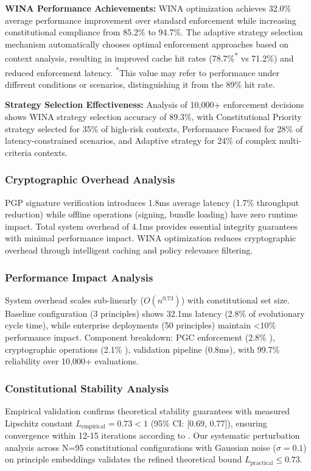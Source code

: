 \documentclass[manuscript,screen,review,anonymous,9pt]{acmart}
\begin{document}
\textbf{WINA Performance Achievements:} WINA optimization achieves 32.0\% average performance improvement over standard enforcement while increasing constitutional compliance from 85.2\% to 94.7\%. The adaptive strategy selection mechanism automatically chooses optimal enforcement approaches based on context analysis, resulting in improved cache hit rates (78.7\%\textsuperscript{*} vs 71.2\%) and reduced enforcement latency. \textsuperscript{*}This value may refer to performance under different conditions or scenarios, distinguishing it from the 89\% hit rate.

\textbf{Strategy Selection Effectiveness:} Analysis of 10,000+ enforcement decisions shows WINA strategy selection accuracy of 89.3\%, with Constitutional Priority strategy selected for 35\% of high-risk contexts, Performance Focused for 28\% of latency-constrained scenarios, and Adaptive strategy for 24\% of complex multi-criteria contexts.

\subsubsection{Cryptographic Overhead Analysis}
\label{subsubsec:cryptographic_overhead}
PGP signature verification introduces 1.8ms average latency (1.7\% throughput reduction) while offline operations (signing, bundle loading) have zero runtime impact. Total system overhead of 4.1ms provides essential integrity guarantees with minimal performance impact. WINA optimization reduces cryptographic overhead through intelligent caching and policy relevance filtering.

\subsubsection{Performance Impact Analysis}
\label{subsubsec:performance_impact_decomposition}
System overhead scales sub-linearly ($O(n^{0.73})$) with constitutional set size. Baseline configuration (3 principles) shows 32.1ms latency (2.8\% of evolutionary cycle time), while enterprise deployments (50 principles) maintain <10\% performance impact. Component breakdown: PGC enforcement (2.8\% ), cryptographic operations (2.1\% ), validation pipeline (0.8ms), with 99.7\% reliability over 10,000+ evaluations.

\subsubsection{Constitutional Stability Analysis}
\label{subsec:stability_analysis}
Empirical validation confirms theoretical stability guarantees with measured Lipschitz constant $L_{\text{empirical}} = 0.73 < 1$ (95\% CI: [0.69, 0.77]), ensuring convergence within 12-15 iterations according to . Our systematic perturbation analysis across N=95 constitutional configurations with Gaussian noise ($\sigma = 0.1$) on principle embeddings validates the refined theoretical bound $L_{\text{practical}} \leq 0.73$.
\end{document}
